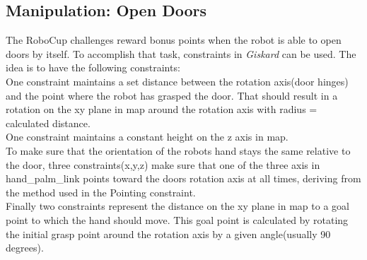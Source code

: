 \documentclass[main.tex]{subfiles}
\begin{document}

		
		\subsection{Manipulation: Open Doors}
		The RoboCup challenges reward bonus points when the robot is able to open doors by itself. To accomplish that task, constraints in \textit{Giskard} can be used. The idea is to have the following constraints:\\
		One constraint maintains a set distance between the rotation axis(door hinges) and the point where the robot has grasped the door. That should result in a rotation on the xy plane in map around the rotation axis with radius = calculated distance.\\
		One constraint maintains a constant height on the z axis in map.\\
		To make sure that the orientation of the robots hand stays the same relative to the door, three constraints(x,y,z) make sure that one of the three axis in hand\_palm\_link points toward the doors rotation axis at all times, deriving from the method used in the Pointing constraint.\\
		Finally two constraints represent the distance on the xy plane in map to a goal point to which the hand should move. This goal point is calculated by rotating the initial grasp point around the rotation axis by a given angle(usually 90 degrees).
		
		
		
	\endgroup
\end{document}
